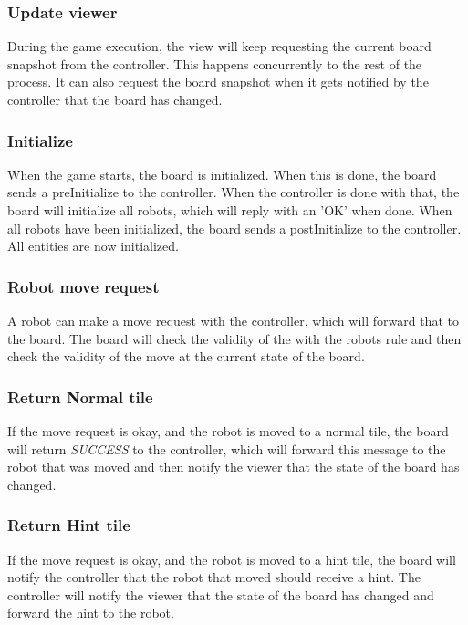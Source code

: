 	

    	\subsubsection{Update viewer}
	During the game execution, the view will keep requesting the current board snapshot from the controller. This happens concurrently to the rest of the process. It can also request the board snapshot when it gets notified by the controller that the board has changed.
    	
	

	\subsubsection{Initialize}
	When the game starts, the board is initialized. When this is done, the board sends a preInitialize to the controller. When the controller is done with that, the board will initialize all robots, which will reply with an 'OK' when done. When all robots have been initialized, the board sends a postInitialize to the controller. All entities are now initialized.
  	
	
    	
	\subsubsection{Robot move request}
	A robot can make a move request with the controller, which will forward that to the board. The board will check the validity of the with the robots rule and then check the validity of the move at the current state of the board.

	

	\subsubsection{Return Normal tile}
	If the move request is okay, and the robot is moved to a normal tile, the board will return \emph{SUCCESS} to the controller, which will forward this message to the robot that was moved and then notify the viewer that the state of the board has changed.

	

	\subsubsection{Return Hint tile}
	If the move request is okay, and the robot is moved to a hint tile, the board will notify the controller that the robot that moved should receive a hint. The controller will notify the viewer that the state of the board has changed and forward the hint to the robot.

